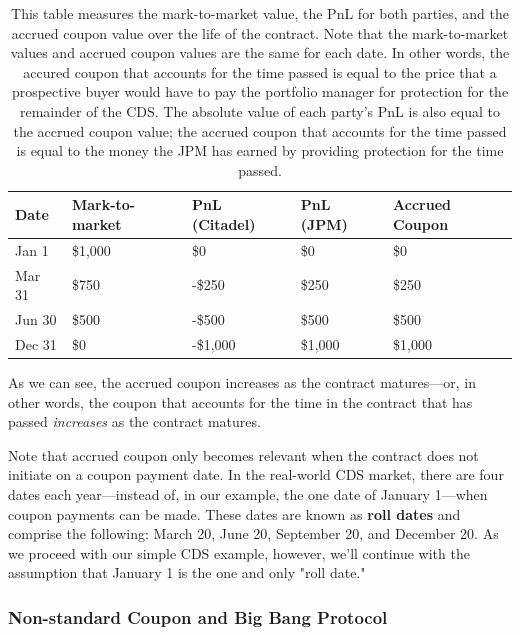 \documentclass[article]{jss}
\begin{document}
\begin{table}[H]
\centering
{\footnotesize
\begin{tabular}{lllll}
  \hline
Date & Mark-to-market & PnL (Citadel) & PnL (JPM) & Accrued Coupon \\ 
  \hline
  Jan 1 & \$1,000 & \$0 & \$0 & \$0\\ 
  Mar 31 & \$750 & -\$250 & \$250 & \$250\\ 
  Jun 30 & \$500 & -\$500 & \$500 & \$500\\ 
  Dec 31 & \$0 & -\$1,000 & \$1,000 & \$1,000\\
   \hline
\end{tabular}
}
\caption{This table measures the mark-to-market value, the PnL for both parties, and the accrued coupon value over the life of the contract. Note that the mark-to-market values and accrued coupon values are the same for each date. In other words, the accured coupon that accounts for the time passed is equal to the price that a prospective buyer would have to pay the portfolio manager for protection for the remainder of the CDS. The absolute value of each party's PnL is also equal to the accrued coupon value; the accrued coupon that accounts for the time passed is equal to the money the JPM has earned by providing protection for the time passed.}
\end{table}

As we can see, the accrued coupon increases as the contract matures---or, in other words, the coupon that accounts for the time in the contract that has passed \emph{increases} as the contract matures.


Note that accrued coupon only becomes relevant when the contract does not initiate on a coupon payment date. In the real-world CDS market, there are four dates each year---instead of, in our example, the one date of January 1---when coupon payments can be made. These dates are known as \textbf{roll dates} and comprise the following: March 20, June 20, September 20, and December 20. As we proceed with our simple CDS example, however, we'll continue with the assumption that January 1 is the one and only "roll date."  

\subsubsection{Non-standard Coupon and Big Bang Protocol}
\label{sec:nonStandardCoupon}
\end{document}

